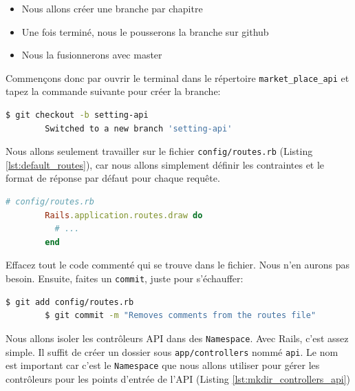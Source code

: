 \documentclass[]{report}
\begin{document}
      \begin{itemize}
        \item Nous allons créer une branche par chapitre
        \item Une fois terminé, nous le pousserons la branche sur github
        \item Nous la fusionnerons avec master
      \end{itemize}

      Commençons donc par ouvrir le terminal dans le répertoire \verb|market_place_api| et tapez la commande suivante pour créer la branche:

      \begin{scriptsize}
        \begin{lstlisting}[language=bash]
        $ git checkout -b setting-api
        Switched to a new branch 'setting-api'
        \end{lstlisting}
      \end{scriptsize}

      Nous allons seulement travailler sur le fichier \verb|config/routes.rb| (Listing \ref{lst:default_routes}), car nous allons simplement définir les contraintes et le format de réponse par défaut pour chaque requête.

      \begin{scriptsize}
        \begin{lstlisting}[language=ruby, caption={Le fichier routes.rb par défault}, label={lst:default_routes}]
        # config/routes.rb
        Rails.application.routes.draw do
          # ...
        end
        \end{lstlisting}
      \end{scriptsize}

      Effacez tout le code commenté qui se trouve dans le fichier. Nous n'en aurons pas besoin. Ensuite, faites un \verb|commit|, juste pour s'échauffer:

      \begin{scriptsize}
        \begin{lstlisting}[language=bash]
        $ git add config/routes.rb
        $ git commit -m "Removes comments from the routes file"
        \end{lstlisting}
      \end{scriptsize}

      Nous allons isoler les contrôleurs API dans des \verb|Namespace|. Avec Rails, c'est assez simple. Il suffit de créer un dossier sous \verb|app/controllers| nommé \verb|api|. Le nom est important car c'est le \verb|Namespace| que nous allons utiliser pour gérer les contrôleurs pour les points d'entrée de l'API (Listing \ref{lst:mkdir_controllers_api})
\end{document}

